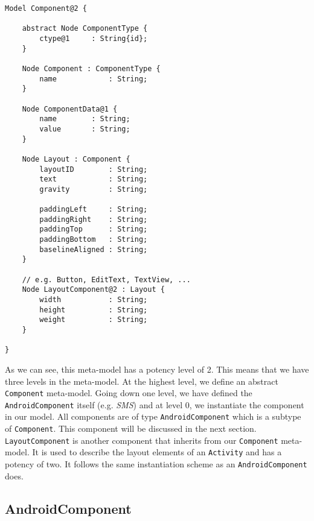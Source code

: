 \begin{lstlisting}[label=component-mm,caption=Component meta-model, captionpos=t]
Model Component@2 {
	
	abstract Node ComponentType {
		ctype@1		: String{id};
	}

	Node Component : ComponentType {
		name			: String;
	}

	Node ComponentData@1 {
		name 		: String;
		value 		: String;
	}
	
	Node Layout : Component {
		layoutID		: String;
		text 			: String;
		gravity			: String;

		paddingLeft 	: String;
		paddingRight	: String;
		paddingTop 		: String;
		paddingBottom 	: String;
		baselineAligned : String;
	}

	// e.g. Button, EditText, TextView, ...
	Node LayoutComponent@2 : Layout {
		width			: String;
		height			: String;
		weight			: String;
	}

}
\end{lstlisting}
As we can see, this meta-model has a potency level of 2. This means that we have three levels in the meta-model. At the highest level, we define an abstract \texttt{Component} meta-model. Going down one level, we have defined the \texttt{AndroidComponent} itself (e.g. \textit{SMS}) and at level 0, we instantiate the component in our model. All components are of type \texttt{AndroidComponent} which is a subtype of \texttt{Component}. This component will be discussed in the next section. \texttt{LayoutComponent} is another component that inherits from our \texttt{Component} meta-model. It is used to describe the layout elements of an \texttt{Activity} and has a potency of two. It follows the same instantiation scheme as an \texttt{AndroidComponent} does.

\subsection{AndroidComponent}

